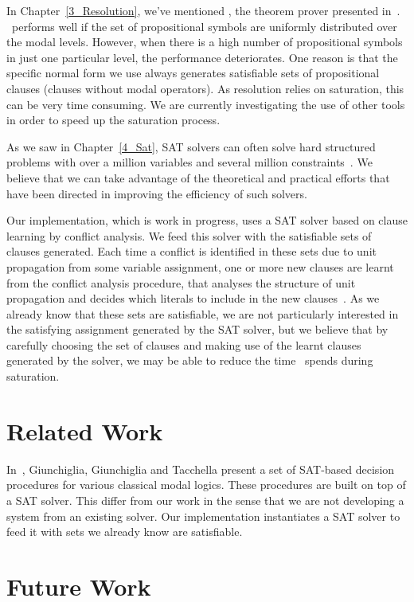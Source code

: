 In Chapter~\ref{3_Resolution}, we've mentioned \ksp, the theorem prover
presented in~\cite{Nalon2016}. \ksp~performs well if the set of propositional
symbols are uniformly distributed over the modal levels. However, when there is
a high number of propositional symbols in just one particular level, the
performance deteriorates. One reason is that the specific normal form we use
always generates satisfiable sets of propositional clauses (clauses
without modal operators). As resolution relies on saturation, this can be very
time consuming. We are currently investigating the use of other tools in order
to speed up the saturation process. 

As we saw in Chapter~\ref{4_Sat}, SAT solvers can often solve hard structured
problems with over a million variables and several million
constraints~\cite{satchapter}. We believe that we can take advantage of the
theoretical and practical efforts that have been directed in improving the
efficiency of such solvers. 

Our implementation, which is work in progress, uses a SAT solver based on clause
learning by conflict analysis. We feed this solver with the satisfiable sets of
clauses generated. Each time a conflict is identified in these sets due to unit
propagation from some variable assignment, one or more new clauses are learnt
from the conflict analysis procedure, that analyses the structure of unit
propagation and decides which literals to include in the new
clauses~\cite{cdclchapter}. As we already know that these sets are satisfiable,
we are not particularly interested in the satisfying assignment generated by the
SAT solver, but we believe that by carefully choosing the set of clauses and
making use of the learnt clauses generated by the solver, we may be able to
reduce the time \ksp~spends during saturation. 


\section{Related Work}
In~\cite{giunchiglia2002sat}, Giunchiglia, Giunchiglia and Tacchella present a
set of SAT-based decision procedures for various classical modal logics. These
procedures are built on top of a SAT solver. This differ from our work in the
sense that we are not developing a system from an existing solver. Our
implementation instantiates a SAT solver to feed it with sets we already know
are satisfiable.

\section{Future Work}
